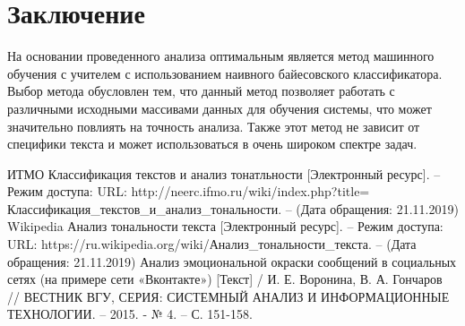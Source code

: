 \documentclass[a4paper,12pt]{report}
\begin{document}
\chapter*{Заключение}
\hspace{0.6cm}На основании проведенного анализа оптимальным является метод машинного обучения с учителем
с использованием наивного байесовского классификатора. Выбор метода обусловлен тем, что данный метод позволяет работать с различными исходными массивами данных для обучения системы, что может значительно повлиять на точность анализа. Также этот метод не зависит от специфики текста и может использоваться в очень широком спектре задач.
\hspace{0.6cm} 

\renewcommand\bibname{Список литературы}
\begin{thebibliography}{2} 
 ИТМО Классификация текстов и анализ тонатльности [Электронный ресурс]. – Режим доступа: URL: http://neerc.ifmo.ru/wiki/index.php?title= \\Классификация\_текстов\_и\_анализ\_тональности. – (Дата обращения: 21.11.2019)
 Wikipedia Анализ тональности текста [Электронный ресурс]. – Режим доступа: URL: https://ru.wikipedia.org/wiki/Анализ\_тональности\_текста. – (Дата обращения: 21.11.2019)
 Анализ эмоциональной окраски сообщений
в социальных сетях (на примере сети «Вконтакте») [Текст]  / И. Е. Воронина, В. А. Гончаров // ВЕСТНИК ВГУ, СЕРИЯ: СИСТЕМНЫЙ АНАЛИЗ И ИНФОРМАЦИОННЫЕ ТЕХНОЛОГИИ. – 2015. - № 4. – С. 151-158.
\end{thebibliography}
\end{document}

